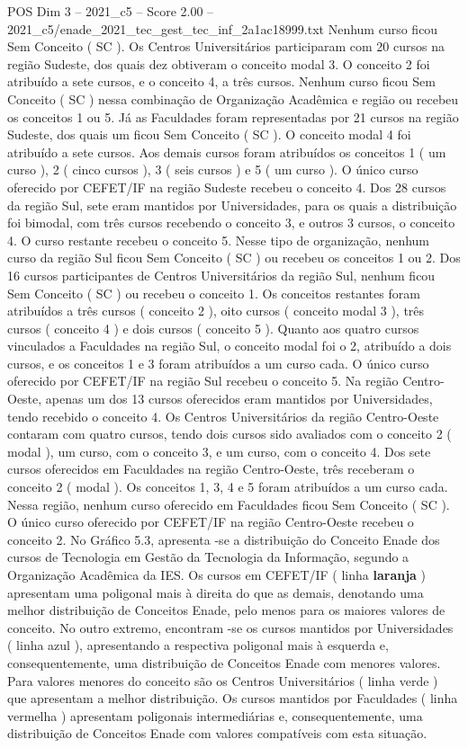 \begin{textsample}{POS Dim 3 – 2021\_c5 – Score 2.00 – 2021\_c5/enade\_2021\_tec\_gest\_tec\_inf\_2a1ac18999.txt}
Nenhum curso ficou Sem Conceito ( SC ).
Os Centros Universitários participaram com 20 cursos na região Sudeste, dos quais dez obtiveram o conceito modal 3.
O conceito 2 foi atribuído a sete cursos, e o conceito 4, a três cursos.
Nenhum curso ficou Sem Conceito ( SC ) nessa combinação de Organização Acadêmica e região ou recebeu os conceitos 1 ou 5.
Já as Faculdades foram representadas por 21 cursos na região Sudeste, dos quais um ficou Sem Conceito ( SC ).
O conceito modal 4 foi atribuído a sete cursos.
Aos demais cursos foram atribuídos os conceitos 1 ( um curso ), 2 ( cinco cursos ), 3 ( seis cursos ) e 5 ( um curso ).
O único curso oferecido por CEFET/IF na região Sudeste recebeu o conceito 4.
Dos 28 cursos da região Sul, sete eram mantidos por Universidades, para os quais a distribuição foi bimodal, com três cursos recebendo o conceito 3, e outros 3 cursos, o conceito 4.
O curso restante recebeu o conceito 5.
Nesse tipo de organização, nenhum curso da região Sul ficou Sem Conceito ( SC ) ou recebeu os conceitos 1 ou 2.
Dos 16 cursos participantes de Centros Universitários da região Sul, nenhum ficou Sem Conceito ( SC ) ou recebeu o conceito 1.
Os conceitos restantes foram atribuídos a três cursos ( conceito 2 ), oito cursos ( conceito modal 3 ), três cursos ( conceito 4 ) e dois cursos ( conceito 5 ).
Quanto aos quatro cursos vinculados a Faculdades na região Sul, o conceito modal foi o 2, atribuído a dois cursos, e os conceitos 1 e 3 foram atribuídos a um curso cada.
O único curso oferecido por CEFET/IF na região Sul recebeu o conceito 5.
Na região Centro-Oeste, apenas um dos 13 cursos oferecidos eram mantidos por Universidades, tendo recebido o conceito 4.
Os Centros Universitários da região Centro-Oeste contaram com quatro cursos, tendo dois cursos sido avaliados com o conceito 2 ( modal ), um curso, com o conceito 3, e um curso, com o conceito 4.
Dos sete cursos oferecidos em Faculdades na região Centro-Oeste, três receberam o conceito 2 ( modal ).
Os conceitos 1, 3, 4 e 5 foram atribuídos a um curso cada.
Nessa região, nenhum curso oferecido em Faculdades ficou Sem Conceito ( SC ).
O único curso oferecido por CEFET/IF na região Centro-Oeste recebeu o conceito 2.
No Gráfico 5.3, apresenta -se a distribuição do Conceito Enade dos cursos de Tecnologia em Gestão da Tecnologia da Informação, segundo a Organização Acadêmica da IES.
Os cursos em CEFET/IF ( linha \textbf{laranja} ) apresentam uma poligonal mais à direita do que as demais, denotando uma melhor distribuição de Conceitos Enade, pelo menos para os maiores valores de conceito.
No outro extremo, encontram -se os cursos mantidos por Universidades ( linha azul ), apresentando a respectiva poligonal mais à esquerda e, consequentemente, uma distribuição de Conceitos Enade com menores valores.
Para valores menores do conceito são os Centros Universitários ( linha verde ) que apresentam a melhor distribuição.
Os cursos mantidos por Faculdades ( linha vermelha ) apresentam poligonais intermediárias e, consequentemente, uma distribuição de Conceitos Enade com valores compatíveis com esta situação.

\end{textsample}
